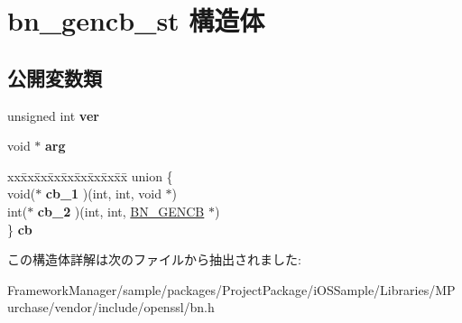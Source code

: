 \hypertarget{structbn__gencb__st}{}\section{bn\+\_\+gencb\+\_\+st 構造体}
\label{structbn__gencb__st}
\subsection*{公開変数類}
\begin{DoxyCompactItemize}
\item 
\hypertarget{structbn__gencb__st_a1c1ac893bd1f6ea3fcfa831fda085086}{}unsigned int {\bfseries ver}\label{structbn__gencb__st_a1c1ac893bd1f6ea3fcfa831fda085086}

\item 
\hypertarget{structbn__gencb__st_a96626e1280d969f4848829c2713f22a7}{}void $\ast$ {\bfseries arg}\label{structbn__gencb__st_a96626e1280d969f4848829c2713f22a7}

\item 
\hypertarget{structbn__gencb__st_a81003f5343d63db8a814faa0bbfde6cc}{}\begin{tabbing}
xx\=xx\=xx\=xx\=xx\=xx\=xx\=xx\=xx\=\kill
union \{\\
\>void($\ast$ {\bfseries cb\_1} )(int, int, void $\ast$)\\
\>int($\ast$ {\bfseries cb\_2} )(int, int, \hyperlink{structbn__gencb__st}{BN\_GENCB} $\ast$)\\
\} {\bfseries cb}\label{structbn__gencb__st_a81003f5343d63db8a814faa0bbfde6cc}
\\

\end{tabbing}\end{DoxyCompactItemize}


この構造体詳解は次のファイルから抽出されました\+:\begin{DoxyCompactItemize}
\item 
Framework\+Manager/sample/packages/\+Project\+Package/i\+O\+S\+Sample/\+Libraries/\+M\+Purchase/vendor/include/openssl/bn.\+h\end{DoxyCompactItemize}
